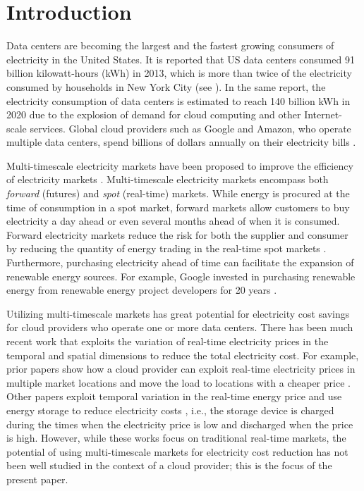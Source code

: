 \section{Introduction}

Data centers are becoming the largest and the fastest growing consumers of electricity in the United States. It is reported that US data centers consumed 91 billion kilowatt-hours (kWh) in 2013, which is more than twice of the electricity consumed by households in New York City (see \cite{whitney2014data}). In the same report, the electricity consumption of data centers is estimated to reach 140 billion kWh in 2020 due to the explosion of demand for cloud computing and other Internet-scale services. Global cloud providers such as Google and Amazon, who operate multiple data centers, spend billions of dollars annually on their electricity bills \cite{qureshi2009cutting}.


Multi-timescale electricity markets have been proposed to improve the efficiency of electricity markets \cite{cramton2007colombia}. Multi-timescale electricity markets encompass both {\em forward}  (futures) and {\em spot} (real-time) markets. While energy is procured at the time of consumption in a spot market, forward markets allow customers to buy electricity a day ahead or even several months ahead of when it is consumed. Forward electricity markets reduce the risk for both the supplier and consumer by reducing the quantity of energy trading in the real-time spot markets \cite{ausubel2010using}. Furthermore, purchasing electricity ahead of time can facilitate the expansion of renewable energy sources. For example, Google invested in purchasing renewable energy from renewable energy project developers for 20 years \cite{google2015datacenter}.


Utilizing multi-timescale markets has great potential for electricity cost savings for cloud providers who operate one or more data centers. There has been much recent work that exploits the variation of real-time electricity prices in the temporal and spatial dimensions to reduce the total electricity cost. For example, prior papers show how a cloud provider can exploit real-time electricity prices in multiple market locations and move the load to locations with a cheaper price \cite{qureshi2009cutting, chiaraviglio2011energy, rao2010minimizing}. Other papers exploit temporal variation in the real-time energy price and use energy storage to reduce electricity costs \cite{guo2011cutting, guo2013electricity,zheng2014exploiting}, i.e., the storage device is charged during the times when the electricity price is low and discharged when the price is high. However, while these works focus on traditional real-time markets, the potential of using multi-timescale markets for electricity cost reduction has not been well studied in the context of a cloud provider; this is the focus of the present paper.

